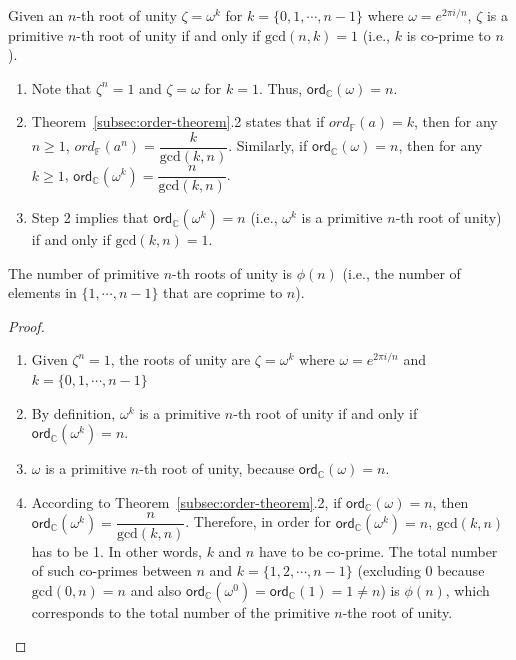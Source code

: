 \begin{tcolorbox}[title={\textbf{\tboxtheorem{\ref*{subsec:roots-theorem}.4} Condition for Primitive $\bm{n}$-th Roots of Unity}}]
Given an $n$-th root of unity $\zeta = \omega^k$ for $k = \{0, 1, \cdots, n-1\}$ where $\omega = e^{2\pi i/n}$, $\zeta$ is a primitive $n$-th root of unity if and only if $\text{gcd}(n, k) = 1$ (i.e., $k$ is co-prime to $n$).
\end{tcolorbox}
\begin{myproof}
    \begin{enumerate}
    \item Note that $\zeta^n = 1$ and $\zeta = \omega$ for $k = 1$. Thus, $\textsf{ord}_{\mathbb{C}}(\omega) = n$.
    \item Theorem~\ref*{subsec:order-theorem}.2 states that if $ord_{\mathbb{F}}(a) = k$, then for any $n \geq 1$, $ord_{\mathbb{F}}(a^n) = \dfrac{k}{\text{gcd}(k,n)}$. Similarly, if $\textsf{ord}_{\mathbb{C}}(\omega) = n$, then for any $k \geq 1$, $\textsf{ord}_{\mathbb{C}}(\omega^k) = \dfrac{n}{\text{gcd}(k, n)}$.
    \item Step 2 implies that $\textsf{ord}_{\mathbb{C}}(\omega^k) = n$ (i.e., $\omega^k$ is a primitive $n$-th root of unity) if and only if $\text{gcd}(k, n) = 1$.
    \end{enumerate}
\end{myproof}

\begin{tcolorbox}[title={\textbf{\tboxtheorem{\ref*{subsec:roots-theorem}.5} The number of Primitive $\bm{n}$-th Roots of Unity}}]
The number of primitive $n$-th roots of unity is $\phi(n)$ (i.e., the number of elements in $\{1, \cdots, n-1 \}$ that are coprime to $n$).
\end{tcolorbox}

\begin{proof}
$ $
\begin{enumerate}
\item Given $\zeta^n = 1$, the roots of unity are $\zeta = \omega^k$ where $\omega = e^{2\pi i/n}$ and $k = \{0, 1, \cdots, n-1\}$ 
\item By definition, $\omega^k$ is a primitive $n$-th root of unity if and only if $\textsf{ord}_{\mathbb{C}}(\omega^k) = n$. 
\item $\omega$ is a primitive $n$-th root of unity, because $\textsf{ord}_{\mathbb{C}}(\omega) = n$. 
\item According to Theorem~\ref*{subsec:order-theorem}.2, if $\textsf{ord}_{\mathbb{C}}(\omega) = n$, then $\textsf{ord}_{\mathbb{C}}(\omega^k) = \dfrac{n}{\text{gcd}(k,n)}$. Therefore, in order for $\textsf{ord}_{\mathbb{C}}(\omega^k) = n$, $\text{gcd}(k,n)$ has to be 1. In other words, $k$ and $n$ have to be co-prime.
The total number of such co-primes between $n$ and $k = \{1, 2, \cdots, n-1\}$ (excluding 0 because $\text{gcd}(0, n)= n$ and also $\textsf{ord}_{\mathbb{C}}(\omega^0) = \textsf{ord}_{\mathbb{C}}(1) = 1 \neq n$) is $\phi(n)$, which corresponds to the total number of the primitive $n$-the root of unity.
\end{enumerate}
\end{proof}